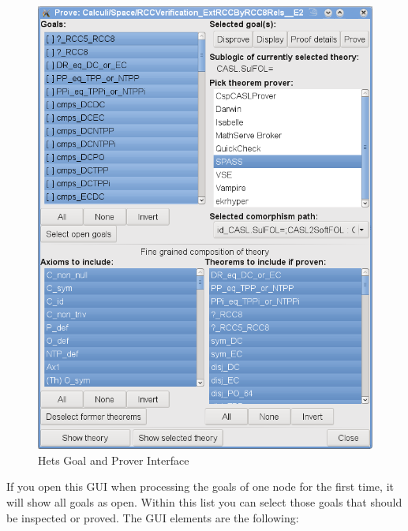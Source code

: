 \documentclass{article}
\begin{document}
\begin{figure}
\centering
\includegraphics[width=\textwidth]{proofmanagement1}
\caption{Hets Goal and Prover Interface\label{fig:proof_window}}
\end{figure}

If you open this GUI when processing the goals of one node for the
first time, it will show all goals as open. Within this list you can
select those goals that should be inspected or proved. The GUI elements are the following:
\end{document}
